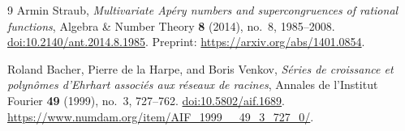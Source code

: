\documentclass[11pt,letterpaper]{article}
\numberwithin{equation}{section}
\theoremstyle{definition}
\begin{document}
\begin{thebibliography}{9}
Armin Straub, \emph{Multivariate Ap\'ery numbers and supercongruences
of rational functions}, Algebra \& Number Theory \textbf{8} (2014),
no.~8, 1985--2008.
\href{https://doi.org/10.2140/ant.2014.8.1985}{doi:10.2140/ant.2014.8.1985}.
Preprint: \url{https://arxiv.org/abs/1401.0854}.

Roland Bacher, Pierre de la Harpe, and Boris Venkov,
\emph{S\'eries de croissance et polyn\^omes d'Ehrhart associ\'es aux
r\'eseaux de racines}, Annales de l'Institut Fourier \textbf{49}
(1999), no.~3, 727--762.
\href{https://doi.org/10.5802/aif.1689}{doi:10.5802/aif.1689}.
\url{https://www.numdam.org/item/AIF_1999__49_3_727_0/}.

\end{thebibliography}
\end{document}
